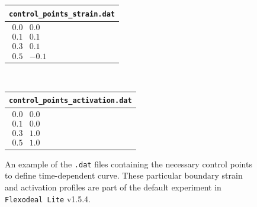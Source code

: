 \documentclass{sfuthesis}
\numberwithin{equation}{section}
\numberwithin{figure}{chapter}
\numberwithin{table}{chapter}
\theoremstyle{definition}
\begin{document}
\begin{figure}
    \centering
    \begin{tabular}{|>{\centering\arraybackslash}m{6cm}|}
        \hline
        \texttt{control\_points\_strain.dat} \\ \hline
        $\begin{matrix}
          0.0 & 0.0 \\
          0.1 & 0.1 \\
          0.3 & 0.1 \\
          0.5 & -0.1
        \end{matrix}$ \\
        \hline
      \end{tabular}\hspace{1em}\scalebox{1.5}{$\Rightarrow$}\hspace{1em}
      \\
      \begin{tabular}{|>{\centering\arraybackslash}m{6cm}|}
        \hline
        \texttt{control\_points\_activation.dat} \\ \hline
        $\begin{matrix}
          0.0 & 0.0 \\
          0.1 & 0.0 \\
          0.3 & 1.0 \\
          0.5 & 1.0
        \end{matrix}$ \\
        \hline
      \end{tabular}\hspace{1em}\scalebox{1.5}{$\Rightarrow$}\hspace{1em}
    \caption{An example of the \texttt{.dat} files containing the necessary control points to define time-dependent curve. These particular boundary strain and activation profiles are part of the default experiment in \texttt{Flexodeal Lite} v1.5.4. \label{fig:flexodeal_lite_act_strain_profiles}}
\end{figure}
\end{document}
